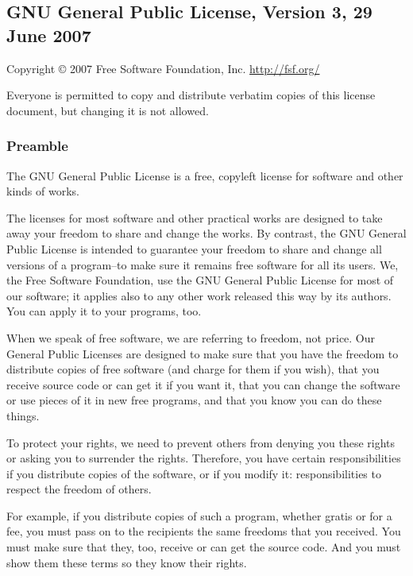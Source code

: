 \documentclass[a4paper, 11pt, twoside]{article}
\begin{document}
\begingroup
\fontsize{7pt}{8pt}
\selectfont

\subsection{GNU General Public License, Version 3, 29 June 2007}

Copyright © 2007 Free Software Foundation, Inc. \href{http://fsf.org/}{http://fsf.org/}

Everyone is permitted to copy and distribute verbatim copies of this license document, but changing it is not allowed.

\subsubsection{Preamble}

The GNU General Public License is a free, copyleft license for software and other kinds of works.

The licenses for most software and other practical works are designed to take away your freedom to share and change the works. By contrast, the GNU General Public License is intended to guarantee your freedom to share and change all versions of a program--to make sure it remains free software for all its users. We, the Free Software Foundation, use the GNU General Public License for most of our software; it applies also to any other work released this way by its authors. You can apply it to your programs, too.

When we speak of free software, we are referring to freedom, not price. Our General Public Licenses are designed to make sure that you have the freedom to distribute copies of free software (and charge for them if you wish), that you receive source code or can get it if you want it, that you can change the software or use pieces of it in new free programs, and that you know you can do these things.

To protect your rights, we need to prevent others from denying you these rights or asking you to surrender the rights. Therefore, you have certain responsibilities if you distribute copies of the software, or if you modify it: responsibilities to respect the freedom of others.

For example, if you distribute copies of such a program, whether gratis or for a fee, you must pass on to the recipients the same freedoms that you received. You must make sure that they, too, receive or can get the source code. And you must show them these terms so they know their rights.
\end{document}

